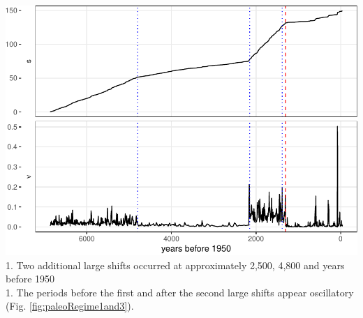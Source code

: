 \documentclass[12pt,twoside,openany]{reedthesis}
\begin{document}
\includegraphics{_myDissertation_files/figure-latex/paleoVelocity-1.pdf}
1. Two additional large shifts occurred at approximately 2,500, 4,800
and years before 1950\\
1. The periods before the first and after the second large shifts appear
oscillatory (Fig. \ref{fig:paleoRegime1and3}).
\end{document}
